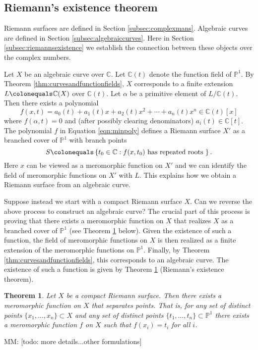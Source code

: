 \documentclass{dcthesis}
\newcommand{\PP}{\mathbb P}
\newcommand{\CC}{\mathbb C}
\newcommand{\mm}[1]{{\color{blue} \sf MM: [#1]}}
\newtheorem{theorem}[prop]{Theorem}
\theoremstyle{definition}
\theoremstyle{remark}
\numberwithin{equation}{section}
\numberwithin{figure}{section}
\begin{document}
{{    \subsection{Riemann's existence theorem}{\label{subsec:riemannsexistence}
      Riemann surfaces are defined in Section \ref{subsec:complexmans}.
      Algebraic curves are defined in Section \ref{subsec:algebraiccurves}.
      Here in Section \ref{subsec:riemannsexistence}
      we establish the connection between these objects over the complex numbers.
      \par
      Let $X$ be an algebraic curve over $\CC$.
      Let $\CC(t)$ denote the function field of $\PP^1$.
      By Theorem \ref{thm:curvesandfunctionfields},
      $X$ corresponds to a finite extension $L\colonequals\CC(X)$
      over $\CC(t)$.
      Let $\alpha$ be a primitive element of $L/\CC(t)$.
      Then there exists a polynomial
      \begin{equation}
        \label{eqn:minpoly}
        f(x,t) = a_0(t)+a_1(t)x+a_2(t)x^2+\cdots+a_n(t)x^n\in\CC(t)[x]
      \end{equation}
      where $f(\alpha,t) = 0$ and (after possibly clearing denominators)
      $a_i(t) \in\CC[t]$.
      The polynomial $f$ in Equation \ref{eqn:minpoly}
      defines a Riemann surface $X'$
      as a branched cover of $\PP^1$
      with branch points
      \[
        S \colonequals\left\{t_0\in\CC : f(x,t_0) \text{ has repeated roots }\right\}.
      \]
      Here $x$ can be viewed as a meromorphic function on $X'$
      and we can identify the field of meromorphic functions on $X'$
      with $L$.
      This explains how we obtain a Riemann surface from an algebraic curve.
      \par
      Suppose instead we start with a compact Riemann surface $X$.
      Can we reverse the above process to construct an algebraic curve?
      The crucial part of this process is proving that
      there exists a meromorphic function on $X$ that realizes $X$
      as a branched cover of $\PP^1$
      (see Theorem \ref{thm:riemannsexistence} below).
      Given the existence of such a function,
      the field of meromorphic functions on $X$ is then realized
      as a finite extension of the meromorphic functions on $\PP^1$.
      Finally,
      by Theorem \ref{thm:curvesandfunctionfields},
      this corresponds to an algebraic curve.
      The existence of such a function
      is given by
      Theorem \ref{thm:riemannsexistence}
      (Riemann's existence theorem).
      \begin{theorem}\label{thm:riemannsexistence}
        Let $X$ be a compact Riemann surface.
        Then there exists a meromorphic function on $X$
        that separates points.
        That is, for any set of distinct points
        $\{x_1,\dots,x_n\}\subset X$
        and any set of distinct points
        $\{t_1,\dots,t_n\}\subset\PP^1$
        there exists a meromorphic function $f$
        on $X$ such that $f(x_i) = t_i$ for all $i$.
      \end{theorem}
      \mm{todo: more details...other formulations}
    }
}}
\end{document}
